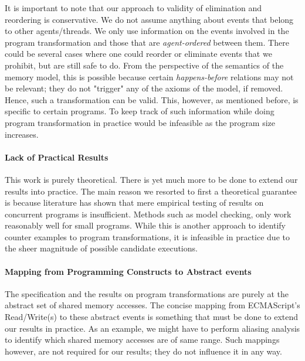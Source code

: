     It is important to note that our approach to validity of elimination and reordering is conservative.
    We do not assume anything about events that belong to other agents/threads. 
    We only use information on the events involved in the program transformation and those that are \textit{agent-ordered} between them.
    There could be several cases where one could reorder or eliminate events that we prohibit, but are still safe to do. 
    From the perspective of the semantics of the memory model, this is possible because certain \textit{happens-before} relations may not be relevant; they do not "trigger" any of the axioms of the model, if removed. 
    Hence, such a transformation can be valid. 
    This, however, as mentioned before, is specific to certain programs. 
    To keep track of such information while doing program transformation in practice would be infeasible as the program size increases.
    
    \paragraph{Lack of Practical Results}
    This work is purely theoretical. 
    There is yet much more to be done to extend our results into practice. 
    The main reason we resorted to first a theoretical guarantee is because literature has shown that mere empirical testing of results on concurrent programs is insufficient. 
    Methods such as model checking, only work reasonably well for small programs. 
    While this is another approach to identify counter examples to program transformations, it is infeasible in practice due to the sheer magnitude of possible candidate executions.

    \paragraph{Mapping from Programming Constructs to Abstract events}
    The specification and the results on program transformations are purely at the abstract set of shared memory accesses.
    The concise mapping from ECMAScript's Read/Write(s) to these abstract events is something that must be done to extend our results in practice.
    As an example, we might have to perform aliasing analysis to identify which shared memory accesses are of same range. 
    Such mappings however, are not required for our results; they do not influence it in any way.
  
 

   